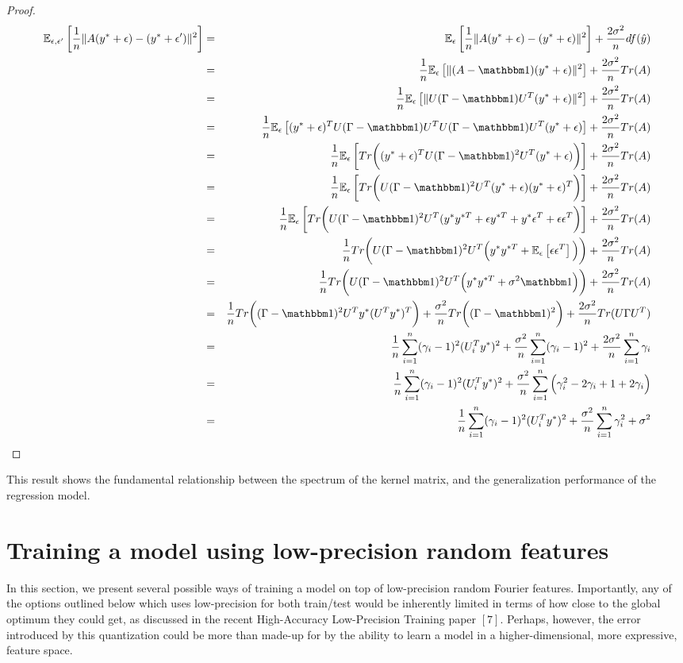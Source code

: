 \documentclass[12pt]{article}
\newcommand{\hy}{\hat{y}}
\newcommand{\eps}{\epsilon}
\begin{document}
\begin{proof}
\begin{eqnarray*}
	\expect{\epsilon,\epsilon'}{\frac{1}{n}\|A(y^*+\eps) - (y^*+\eps')\|^2} 
	&=& \expect{\epsilon}{\frac{1}{n}\|A(y^*+\eps) - (y^*+\eps)\|^2} + \frac{2\sigma^2}{n}df(\hy) \\
	&=& \frac{1}{n}\expect{\epsilon}{\|(A-\id)(y^*+\eps)\|^2} + \frac{2\sigma^2}{n}Tr(A) \\
	&=& \frac{1}{n}\expect{\epsilon}{\|U(\Gamma-\id)U^T(y^*+\eps)\|^2} + \frac{2\sigma^2}{n}Tr(A) \\
	&=& \frac{1}{n}\expect{\epsilon}{(y^*+\eps)^TU(\Gamma-\id)U^TU(\Gamma-\id)U^T(y^*+\eps)} + \frac{2\sigma^2}{n}Tr(A) \\
	&=& \frac{1}{n}\expect{\epsilon}{Tr\bigg((y^*+\eps)^TU(\Gamma-\id)^2 U^T(y^*+\eps)\bigg)} + \frac{2\sigma^2}{n}Tr(A) \\
	&=& \frac{1}{n}\expect{\epsilon}{Tr\bigg(U(\Gamma-\id)^2 U^T(y^*+\eps)(y^*+\eps)^T\bigg)} + \frac{2\sigma^2}{n}Tr(A) \\
	&=& \frac{1}{n}\expect{\epsilon}{Tr\bigg(U(\Gamma-\id)^2 U^T(y^* y^{*T} + \eps y^{*T} + y^*\eps^T + \eps \eps^T\bigg)} + \frac{2\sigma^2}{n}Tr(A) \\
	&=& \frac{1}{n}Tr\bigg(U(\Gamma-\id)^2 U^T\Big(y^* y^{*T} + \expect{\epsilon}{ \eps \eps^T}\Big)\bigg) + \frac{2\sigma^2}{n}Tr(A) \\
	&=& \frac{1}{n}Tr\bigg(U(\Gamma-\id)^2 U^T\Big(y^* y^{*T} + \sigma^2 \id \Big)\bigg) + \frac{2\sigma^2}{n}Tr(A) \\
	&=& \frac{1}{n}Tr\bigg((\Gamma-\id)^2 U^T y^* (U^T y^*)^T\bigg)  + \frac{\sigma^2}{n}Tr\bigg((\Gamma-\id)^2\bigg) + \frac{2\sigma^2}{n}Tr(U\Gamma U^T) \\
	&=& \frac{1}{n}\sum_{i=1}^n (\gamma_i-1)^2 (U_i^T y^*)^2 + \frac{\sigma^2}{n}\sum_{i=1}^n (\gamma_i-1)^2 + \frac{2\sigma^2}{n}\sum_{i=1}^n \gamma_i\\
	&=& \frac{1}{n}\sum_{i=1}^n (\gamma_i-1)^2 (U_i^T y^*)^2 + \frac{\sigma^2}{n}\sum_{i=1}^n \Big(\gamma_i^2 -2\gamma_i + 1 + 2\gamma_i\Big) \\
	&=& \frac{1}{n}\sum_{i=1}^n (\gamma_i-1)^2 (U_i^T y^*)^2 + \frac{\sigma^2}{n}\sum_{i=1}^n \gamma_i^2 + \sigma^2
\end{eqnarray*}
\end{proof}

This result shows the fundamental relationship between the spectrum of the kernel matrix, and the generalization performance of the regression model.
\section{Training a model using low-precision random features}
\label{sec:train}
In this section, we present several possible ways of training a model on top of low-precision random Fourier features.  Importantly, any of the options outlined below which uses low-precision for both train/test would be inherently limited in terms of how close to the global optimum they could get, as discussed in the recent High-Accuracy Low-Precision Training paper $[7]$.  Perhaps, however, the error introduced by this quantization could be more than made-up for by the ability to learn a model in a higher-dimensional, more expressive, feature space.
\end{document}
